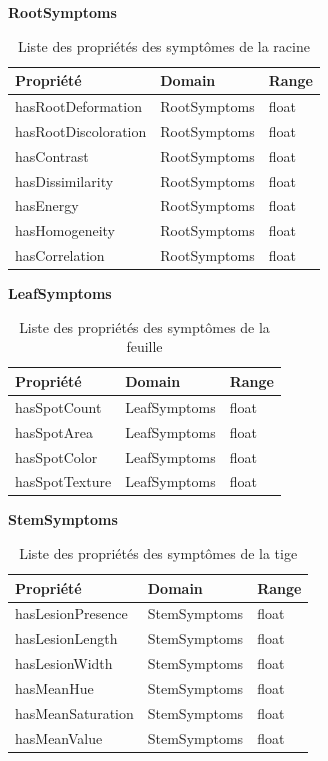 \FloatBarrier

\noindent\textbf{RootSymptoms}
\begin{table}[H]
	\centering
	\begin{tabular}{|p{5cm}|p{5cm}|p{5cm}|}
		\hline
		\textbf{Propriété} & \textbf{Domain} & \textbf{Range} \\
		\hline
		hasRootDeformation & RootSymptoms & float \\
		\hline
		hasRootDiscoloration & RootSymptoms & float \\
		\hline
		hasContrast & RootSymptoms & float \\
		\hline
		hasDissimilarity & RootSymptoms & float \\
		\hline
		hasEnergy & RootSymptoms & float \\
		\hline
		hasHomogeneity & RootSymptoms & float \\
		\hline
		hasCorrelation & RootSymptoms & float \\
		\hline
	\end{tabular}
	\caption{Liste des propriétés des symptômes de la racine}
\end{table}

\FloatBarrier

\noindent\textbf{LeafSymptoms}
\begin{table}[H]
	\centering
	\begin{tabular}{|p{5cm}|p{5cm}|p{5cm}|}
		\hline
		\textbf{Propriété} & \textbf{Domain} & \textbf{Range} \\
		\hline
		hasSpotCount & LeafSymptoms & float \\
		\hline
		hasSpotArea & LeafSymptoms & float \\
		\hline
		hasSpotColor & LeafSymptoms & float \\
		\hline
		hasSpotTexture & LeafSymptoms & float \\
		\hline
	\end{tabular}
	\caption{Liste des propriétés des symptômes de la feuille}
\end{table}

\FloatBarrier

\noindent\textbf{StemSymptoms}
\begin{table}[H]
	\centering
	\begin{tabular}{|p{5cm}|p{5cm}|p{5cm}|}
		\hline
		\textbf{Propriété} & \textbf{Domain} & \textbf{Range} \\
		\hline
		hasLesionPresence & StemSymptoms & float \\
		\hline
		hasLesionLength & StemSymptoms & float \\
		\hline
		hasLesionWidth & StemSymptoms & float \\
		\hline
		hasMeanHue & StemSymptoms & float \\
		\hline
		hasMeanSaturation & StemSymptoms & float \\
		\hline
		hasMeanValue & StemSymptoms & float \\
		\hline
	\end{tabular}
	\caption{Liste des propriétés des symptômes de la tige}
\end{table}

